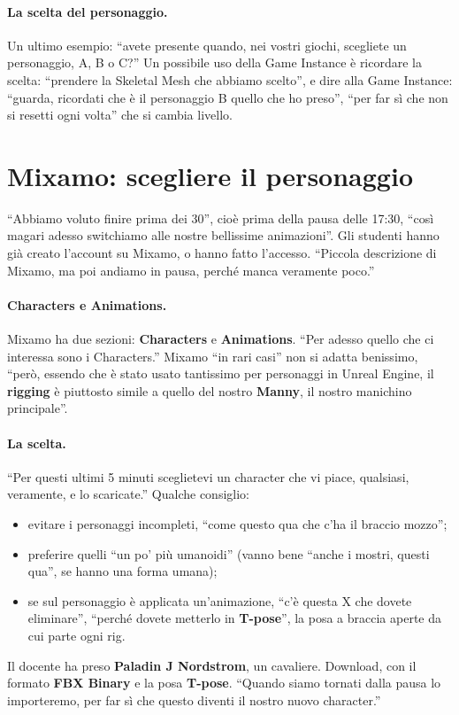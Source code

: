 \paragraph{La scelta del personaggio.} Un ultimo esempio: ``avete presente quando, nei
vostri giochi, scegliete un personaggio, A, B o C?'' Un possibile uso della Game Instance
è ricordare la scelta: ``prendere la Skeletal Mesh che abbiamo scelto'', e dire alla Game
Instance: ``guarda, ricordati che è il personaggio B quello che ho preso'', ``per far sì
che non si resetti ogni volta'' che si cambia livello.

\section{Mixamo: scegliere il personaggio}
\label{ue8:sec:mixamochar}

``Abbiamo voluto finire prima dei 30'', cioè prima della pausa delle 17:30, ``così magari
adesso switchiamo alle nostre bellissime animazioni''. Gli studenti hanno già creato
l'account su Mixamo, o hanno fatto l'accesso. ``Piccola descrizione di Mixamo, ma poi
andiamo in pausa, perché manca veramente poco.''

\paragraph{Characters e Animations.} Mixamo ha due sezioni: \textbf{Characters} e
\textbf{Animations}. ``Per adesso quello che ci interessa sono i Characters.'' Mixamo
``in rari casi'' non si adatta benissimo, ``però, essendo che è stato usato tantissimo per
personaggi in Unreal Engine, il \textbf{rigging} è piuttosto simile a quello del nostro
\textbf{Manny}, il nostro manichino principale''.

\paragraph{La scelta.} ``Per questi ultimi 5 minuti sceglietevi un character che vi
piace, qualsiasi, veramente, e lo scaricate.'' Qualche consiglio:
\begin{itemize}
  \item evitare i personaggi incompleti, ``come questo qua che c'ha il braccio mozzo'';
  \item preferire quelli ``un po' più umanoidi'' (vanno bene ``anche i mostri, questi
        qua'', se hanno una forma umana);
  \item se sul personaggio è applicata un'animazione, ``c'è questa X che dovete
        eliminare'', ``perché dovete metterlo in \textbf{T-pose}'', la posa a braccia
        aperte da cui parte ogni rig.
\end{itemize}
Il docente ha preso \textbf{Paladin J Nordstrom}, un cavaliere. Download, con il formato
\textbf{FBX Binary} e la posa \textbf{T-pose}. ``Quando siamo tornati dalla pausa lo
importeremo, per far sì che questo diventi il nostro nuovo character.''

